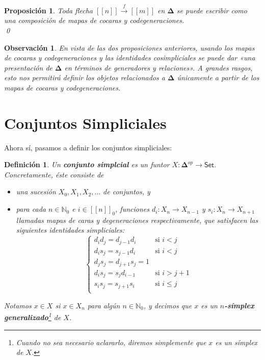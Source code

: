 \documentclass[11pt]{report}
\theoremstyle{colored}
\newtheorem{definition}{Definición}[section]
\newtheorem{proposition}{Proposición}[section]
\newtheorem{remark}{Observación}[section]
\newcommand{\N}{\mathbb{N}}
\newcommand{\nat}[1]{[\![#1]\!]}
\newcommand{\ord}[1]{\nat{#1}}
\newcommand{\natzero}[1]{\nat{#1}_0}
\newcommand{\cat}[1]{\mathsf{#1}}
\newcommand{\ordcat}{\boldsymbol{\Delta}}
\begin{document}
\begin{proposition} Toda flecha $\ord{n} \xrightarrow{f} \ord{m}$ en $\ordcat$ se puede escribir como una composición de mapas de cocaras y codegeneraciones. \\ \qed
\end{proposition}

\begin{remark} En vista de las dos proposiciones anteriores,  usando los mapas de cocaras y codegeneraciones y las identidades cosimpliciales se puede dar «una presentación de $\ordcat$ en términos de generadores y relaciones». A grandes rasgos, esto nos permitirá definir los objetos relacionados a $\ordcat$ únicamente a partir de los mapas de cocaras y codegeneraciones.
\end{remark}

\section{Conjuntos Simpliciales}

Ahora sí, pasamos a definir los conjuntos simpliciales:

\begin{definition} Un \textbf{conjunto simplcial} es un funtor $X : \ordcat^{op} \to \cat{Set}$. Concretamente, éste consiste de 
\begin{itemize}
\item[(i)] una sucesión $X_0,X_1,X_2, \dots$ de conjuntos, y \item[(ii)] para cada $n \in \N_0$ e $i \in \natzero{n}$, funciones 
$d_i : X_n \to X_{n-1}$ y $s_i : X_n \to X_{n+1}$ llamadas mapas de caras y degeneraciones respectivamente, que satisfacen las siguientes \textit{identidades simpliciales}:
\[
\begin{cases}
d_id_j = d_{j-1}d_i &\text{si $i < j$}\\
d_is_j = s_{j-1}d_i &\text{si $i < j$}\\
d_js_j = d_{j+1}s_j = 1\\
d_is_j = s_jd_{i-1} &\text{si $i > j+1$}\\
s_is_j = s_{j+1}s_i &\text{si $i \leq j$}\\
\end{cases}
\] 
\end{itemize}
Notamos $x \in X$ si $x \in X_n$ para algún $n \in \N_0$, y decimos que $x$ es un \textbf{$n$-símplex generalizado}\footnote{Cuando no sea necesario aclararlo, diremos simplemente que $x$ es un símplex de $X$.} de $X$.\\
\end{definition}
\end{document}
